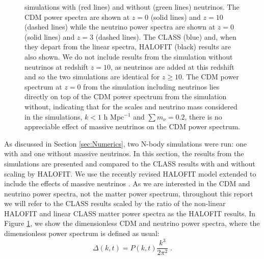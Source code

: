 \documentclass{aastex}
\newcommand{\halofit}{HALOFIT }
\newcommand{\halofitns}{HALOFIT}
\begin{document}
\begin{figure}[h!]
{     simulations with (red lines) and without (green lines) neutrinos.  
    The CDM power spectra are shown at $z=0$ (solid lines)
     and $z=10$ (dashed lines) while the neutrino power spectra are shown
     at $z=0$ (solid lines) and $z=3$ (dashed lines).  
     The CLASS (blue) and, when they depart from the linear spectra, 
     \halofit (black) results are also shown.  
      We do not include results from the simulation without neutrinos
      at redshift $z=10$, as neutrinos are added at this redshift
      and so the two simulations are identical for $z\ge10$.  The CDM 
      power spectrum at $z=0$ from the simulation including
      neutrinos lies directly on top of the 
      CDM power spectrum from the simulation without, 
indicating that for the scales and neutrino
      mass considered in the simulations, $k<1$ h Mpc$^{-1}$ and $\textstyle\sum m_\nu
    = 0.2$, there is no appreciable effect of massive neutrinos on the
    CDM power spectrum.
}\label{fig:density}
\end{figure}


As discussed in Section \ref{sec:Numerics}, two 
N-body simulations were
run: one  with and one without massive neutrinos. 
In this section, the results from the simulations are
presented and compared to the CLASS results with and without scaling by \halofitns.  We use the recently
revised \halofit model \citep{takahashi12} extended to include the effects of massive
neutrinos \citep{bird12}. As we are interested in the CDM
and neutrino power spectra, not the matter power spectrum, throughout
this report we will refer to the CLASS results scaled by the
ratio of the non-linear \halofit and linear CLASS matter power spectra
as the \halofit results.
In Figure \ref{fig:density}, we
show the dimensionless CDM and neutrino power spectra,
where the dimensionless power spectrum is defined as usual:
\begin{equation}
  \Delta(k,t) = P(k,t) \frac{ k^3 }{2 \pi^2} \;.
\end{equation} 
\end{document}
